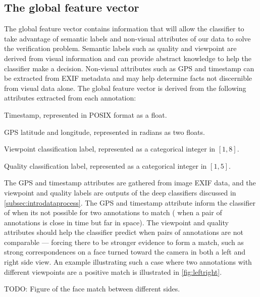 \subsection{The global feature vector}

The global feature vector contains information that will allow the classifier to take advantage of semantic
  labels and non-visual attributes of our data to solve the verification problem.
Semantic labels such as quality and viewpoint are derived from visual information and can provide abstract
  knowledge to help the classifier make a decision.
Non-visual attributes such as GPS and timestamp can be extracted from EXIF metadata and may help determine facts
  not discernible from visual data alone.
The global feature vector is derived from the following attributes extracted from each annotation:
\begin{enumln}

    \item Timestamp, represented in POSIX format as a float.

    \item GPS latitude and longitude, represented in radians as two floats. 

    \item Viewpoint classification label, represented as a categorical integer in $[1,8]$.

    \item Quality classification label, represented as a categorical integer in $[1,5]$.
\end{enumln}
The GPS and timestamp attributes are gathered from image EXIF data, and the viewpoint and quality labels are
  outputs of the deep classifiers discussed in \cref{subsec:introdataprocess}.
The GPS and timestamp attribute inform the classifier of when its not possible for two annotations to match
  (\eg{} when a pair of annotations is close in time but far in space).
The viewpoint and quality attributes should help the classifier predict when pairs of annotations are not
  comparable --- forcing there to be stronger evidence to form a match, such as strong correspondences on a face
  turned toward the camera in both a left and right side view.
An example illustrating such a case where two annotations with different viewpoints are a positive match is
  illustrated in \cref{fig:leftright}.


TODO: Figure of the face match between different sides.



